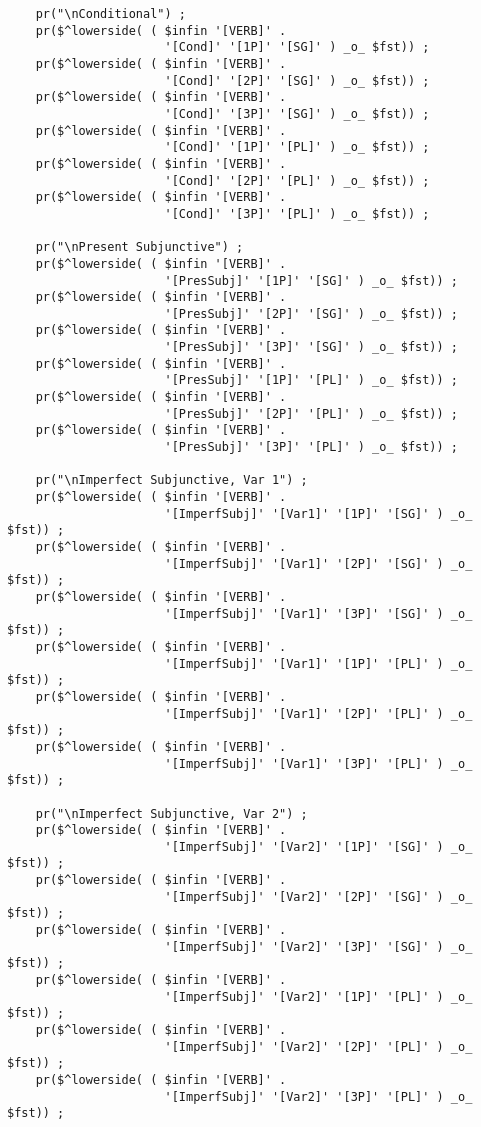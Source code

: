 \begin{Verbatim}
    pr("\nConditional") ;
    pr($^lowerside( ( $infin '[VERB]' . 
                      '[Cond]' '[1P]' '[SG]' ) _o_ $fst)) ;
    pr($^lowerside( ( $infin '[VERB]' . 
                      '[Cond]' '[2P]' '[SG]' ) _o_ $fst)) ;
    pr($^lowerside( ( $infin '[VERB]' . 
                      '[Cond]' '[3P]' '[SG]' ) _o_ $fst)) ;
    pr($^lowerside( ( $infin '[VERB]' . 
                      '[Cond]' '[1P]' '[PL]' ) _o_ $fst)) ;
    pr($^lowerside( ( $infin '[VERB]' . 
                      '[Cond]' '[2P]' '[PL]' ) _o_ $fst)) ;
    pr($^lowerside( ( $infin '[VERB]' . 
                      '[Cond]' '[3P]' '[PL]' ) _o_ $fst)) ;

    pr("\nPresent Subjunctive") ;
    pr($^lowerside( ( $infin '[VERB]' . 
                      '[PresSubj]' '[1P]' '[SG]' ) _o_ $fst)) ;
    pr($^lowerside( ( $infin '[VERB]' . 
                      '[PresSubj]' '[2P]' '[SG]' ) _o_ $fst)) ;
    pr($^lowerside( ( $infin '[VERB]' . 
                      '[PresSubj]' '[3P]' '[SG]' ) _o_ $fst)) ;
    pr($^lowerside( ( $infin '[VERB]' . 
                      '[PresSubj]' '[1P]' '[PL]' ) _o_ $fst)) ;
    pr($^lowerside( ( $infin '[VERB]' . 
                      '[PresSubj]' '[2P]' '[PL]' ) _o_ $fst)) ;
    pr($^lowerside( ( $infin '[VERB]' . 
                      '[PresSubj]' '[3P]' '[PL]' ) _o_ $fst)) ;

    pr("\nImperfect Subjunctive, Var 1") ;
    pr($^lowerside( ( $infin '[VERB]' . 
                      '[ImperfSubj]' '[Var1]' '[1P]' '[SG]' ) _o_ $fst)) ;
    pr($^lowerside( ( $infin '[VERB]' . 
                      '[ImperfSubj]' '[Var1]' '[2P]' '[SG]' ) _o_ $fst)) ;
    pr($^lowerside( ( $infin '[VERB]' . 
                      '[ImperfSubj]' '[Var1]' '[3P]' '[SG]' ) _o_ $fst)) ;
    pr($^lowerside( ( $infin '[VERB]' . 
                      '[ImperfSubj]' '[Var1]' '[1P]' '[PL]' ) _o_ $fst)) ;
    pr($^lowerside( ( $infin '[VERB]' . 
                      '[ImperfSubj]' '[Var1]' '[2P]' '[PL]' ) _o_ $fst)) ;
    pr($^lowerside( ( $infin '[VERB]' . 
                      '[ImperfSubj]' '[Var1]' '[3P]' '[PL]' ) _o_ $fst)) ;

    pr("\nImperfect Subjunctive, Var 2") ;
    pr($^lowerside( ( $infin '[VERB]' . 
                      '[ImperfSubj]' '[Var2]' '[1P]' '[SG]' ) _o_ $fst)) ;
    pr($^lowerside( ( $infin '[VERB]' . 
                      '[ImperfSubj]' '[Var2]' '[2P]' '[SG]' ) _o_ $fst)) ;
    pr($^lowerside( ( $infin '[VERB]' . 
                      '[ImperfSubj]' '[Var2]' '[3P]' '[SG]' ) _o_ $fst)) ;
    pr($^lowerside( ( $infin '[VERB]' . 
                      '[ImperfSubj]' '[Var2]' '[1P]' '[PL]' ) _o_ $fst)) ;
    pr($^lowerside( ( $infin '[VERB]' . 
                      '[ImperfSubj]' '[Var2]' '[2P]' '[PL]' ) _o_ $fst)) ;
    pr($^lowerside( ( $infin '[VERB]' . 
                      '[ImperfSubj]' '[Var2]' '[3P]' '[PL]' ) _o_ $fst)) ;


\end{Verbatim}
